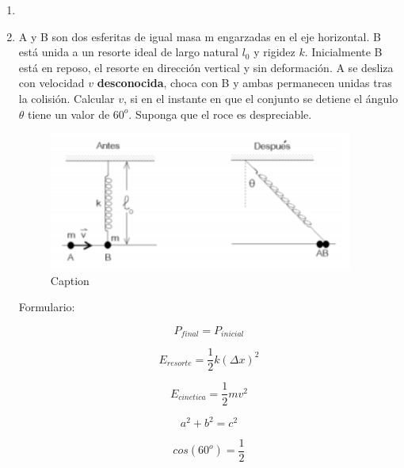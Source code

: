 \documentclass[letterpaper,11pt]{article}
\begin{document}
\vspace{-1cm}
\begin{enumerate}\setlength{\itemsep}{0.4cm}


\item[]

\item A y B son dos esferitas de igual masa m engarzadas en el eje horizontal. B
está unida a un resorte ideal de largo natural $l_0$ y rigidez $k$. Inicialmente B está en reposo, el resorte en dirección vertical y sin deformación. A se desliza con velocidad $v$ \textbf{desconocida}, choca con B y ambas permanecen unidas tras la colisión. Calcular $v$, si en el instante en que el
conjunto se detiene el ángulo $\theta$ tiene un valor de $60^o$. Suponga que el roce es
despreciable.

\begin{figure}[H]
    \centering
    \includegraphics[width=10cm]{2021-2/img/ejercicios/ej8.PNG}
    \caption{Caption}
    \label{fig:ej8}
\end{figure}
Formulario:

\begin{equation}
    P_{final}=P_{inicial}
\end{equation}

\begin{equation}
    E_{resorte}=\frac{1}{2}k(\Delta x)^2
\end{equation}

\begin{equation}
    E_{cinetica}=\frac{1}{2}mv^2
\end{equation}

\begin{equation}
    a^2+b^2=c^2
\end{equation}

\begin{equation}
    cos(60^o)=\frac{1}{2}
\end{equation}
%   

\end{enumerate}
\end{document}
